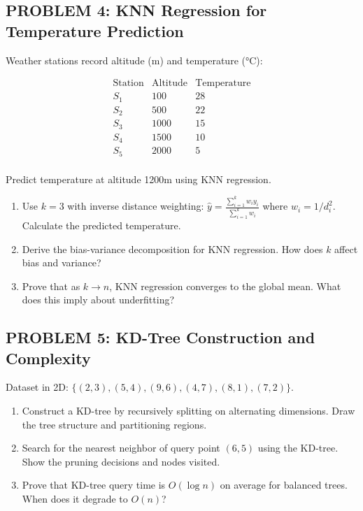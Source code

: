\documentclass[12pt]{article}
\begin{document}
\subsection*{PROBLEM 4: KNN Regression for Temperature Prediction}

Weather stations record altitude (m) and temperature (°C):

\[\begin{array}{c|c|c}
\text{Station} & \text{Altitude} & \text{Temperature} \\
\hline
S_1 & 100 & 28 \\
S_2 & 500 & 22 \\
S_3 & 1000 & 15 \\
S_4 & 1500 & 10 \\
S_5 & 2000 & 5 \\
\end{array}\]

Predict temperature at altitude 1200m using KNN regression.

\begin{enumerate}
\item[(a)] Use \(k=3\) with inverse distance weighting: \(\hat{y} = \frac{\sum_{i=1}^k w_i y_i}{\sum_{i=1}^k w_i}\) where \(w_i = 1/d_i^2\). Calculate the predicted temperature.
\item[(b)] Derive the bias-variance decomposition for KNN regression. How does \(k\) affect bias and variance?
\item[(c)] Prove that as \(k \to n\), KNN regression converges to the global mean. What does this imply about underfitting?
\end{enumerate}

\subsection*{PROBLEM 5: KD-Tree Construction and Complexity}

Dataset in 2D: \(\{(2,3), (5,4), (9,6), (4,7), (8,1), (7,2)\}\).

\begin{enumerate}
\item[(a)] Construct a KD-tree by recursively splitting on alternating dimensions. Draw the tree structure and partitioning regions.
\item[(b)] Search for the nearest neighbor of query point \((6, 5)\) using the KD-tree. Show the pruning decisions and nodes visited.
\item[(c)] Prove that KD-tree query time is \(O(\log n)\) on average for balanced trees. When does it degrade to \(O(n)\)?
\end{enumerate}
\end{document}
